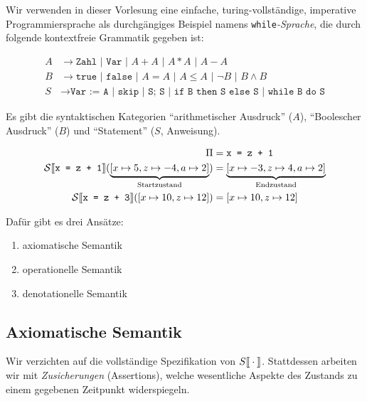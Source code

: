 \begin{definition}
    Wir verwenden in dieser Vorlesung eine einfache, turing-vollständige, imperative Programmiersprache als durchgängiges Beispiel namens \texttt{while}\emph{-Sprache}, die durch folgende kontextfreie Grammatik gegeben ist:
\end{definition}
\vspace*{-2em}
\begin{align*}
    A & \to \texttt{Zahl | Var | $A + A$ | $A * A$ | $A - A$} \\
    B & \to \texttt{true | false | $A = A$ | $A \leq A$ | $\neg B$ | $B \wedge B$} \\
    S & \to \texttt{Var := A | skip | S; S | if B then S else S | while B do S}
\end{align*}
\begin{remark}
    Es gibt die syntaktischen Kategorien ``arithmetischer Ausdruck'' ($A$), ``Boolescher Ausdruck'' ($B$) und ``Statement'' ($S$, Anweisung).
\end{remark}

\begin{example}
    \begin{align*}
        \Pi & = \texttt{x = z + 1} \\
        \mathcal{S}\mathrm{[}\kern-.14em\mathrm{[}\texttt{x = z + 1}\mathrm{]}\kern-.14em\mathrm{]}(\underbrace{[x \mapsto 5, z \mapsto -4, a \mapsto 2]}_{\text{Startzustand}}) & = \underbrace{[x \mapsto -3, z \mapsto 4, a \mapsto 2]}_{\text{Endzustand}} \\
        \mathcal{S}\mathrm{[}\kern-.14em\mathrm{[}\texttt{x = z + 3}\mathrm{]}\kern-.14em\mathrm{]}([x \mapsto 10, z \mapsto 12]) & = [x \mapsto 10, z \mapsto 12]
    \end{align*}
\end{example}



Dafür gibt es drei Ansätze:
\begin{enumerate}
    \item axiomatische Semantik
    \item operationelle Semantik
    \item denotationelle Semantik
\end{enumerate}


\subsection{Axiomatische Semantik}

Wir verzichten auf die vollständige Spezifikation von $S\mathrm{[}\kern-.14em\mathrm{[}\cdot\mathrm{]}\kern-.14em\mathrm{]}$. Stattdessen arbeiten wir mit \emph{Zusicherungen} (Assertions), welche wesentliche Aspekte des Zustands zu einem gegebenen Zeitpunkt widerspiegeln.


